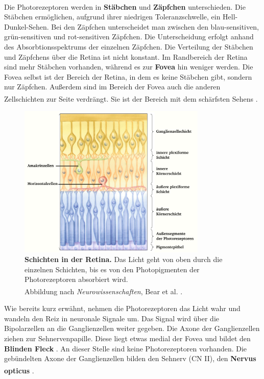 \documentclass[12pt,a4paper,pdftex]{article}
\begin{document}
\\
\noindent Die Photorezeptoren werden in \textbf{Stäbchen}  und \textbf{Zäpfchen}  unterschieden. Die Stäbchen ermöglichen, aufgrund ihrer niedrigen Toleranzschwelle, ein Hell-Dunkel-Sehen. Bei den Zäpfchen unterscheidet man zwischen den blau-sensitiven, grün-sensitiven und rot-sensitiven Zäpfchen. Die Unterscheidung erfolgt anhand des Absorbtionsspektrums der einzelnen Zäpfchen. Die Verteilung der Stäbchen und Zäpfchens über die Retina ist nicht konstant. Im Randbereich der Retina sind mehr Stäbchen vorhanden, während es zur \textbf{Fovea}  hin weniger werden. Die Fovea selbst ist der Bereich der Retina, in dem es keine Stäbchen gibt, sondern nur Zäpfchen. Außerdem sind im Bereich der Fovea auch die anderen Zellschichten zur Seite verdrängt. Sie ist der Bereich mit dem schärfsten Sehens \textsuperscript{\cite[10]{neurowissenschaften_baer}}.
\begin{figure}[H]
    \centering
    \includegraphics[width = 0.8\textwidth]{pictures/visual/retina.png}
    \caption[Schichten in der Retina]{\textbf{Schichten in der Retina.} Das Licht geht von oben durch die einzelnen Schichten, bis es von den Photopigmenten der Photorezeptoren absorbiert wird. \\
    Abbildung nach \textit{Neurowissenschaften}, Bear et al. \textsuperscript{\cite[10]{neurowissenschaften_baer}}.}
    \label{fig:retina}
\end{figure}

Wie bereits kurz erwähnt, nehmen die Photorezeptoren das Licht wahr und wandeln den Reiz in neuronale Signale um. Das Signal wird über die Bipolarzellen an die Ganglienzellen weiter gegeben. Die Axone der Ganglienzellen ziehen zur Sehnervenpapille. Diese liegt etwas medial der Fovea und bildet den \textbf{Blinden Fleck} . An dieser Stelle sind keine Photorezeptoren vorhanden. Die gebündelten Axone der Ganglienzellen bilden den Sehnerv (CN II), den \textbf{Nervus opticus} \textsuperscript{\cite[15]{crossman2014neuroanatomy}}.  
\end{document}
